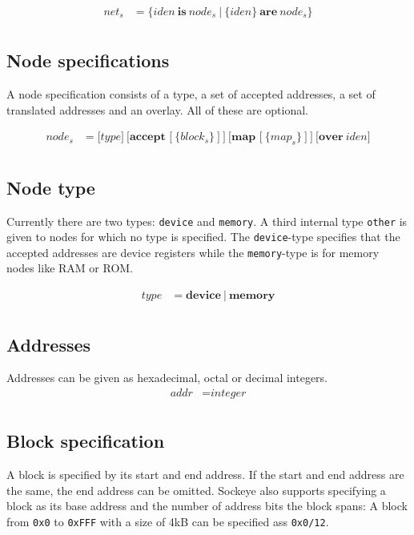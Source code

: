 \documentclass[a4paper,11pt,twoside]{report}
\begin{document}
{{\begin{align*}
\textit{net}_s & \mathop{=}
	\Big\{
		\textit{iden}\ \textbf{is}\ \textit{node}_s\
	\Big|\
		\bigl\{ \textit{iden}\bigr\}\ \textbf{are}\ \textit{node}_s
	\Big\} \\
\end{align*}

\subsection{Node specifications}
A node specification consists of a type, a set of accepted addresses, a set of translated addresses and an overlay.
All of these are optional.

\begin{align*}
\textit{node}_s & \mathop{=}
	\Big[
		\textit{type}
	\Big]\ 	
	\Big[
		\textbf{accept [}\ \big\{\textit{block}_s\big\}\ \textbf{]}\ 
	\Big]\ 
	\Big[
		\textbf{map [}\ \big\{\textit{map}_s\big\}\ \textbf{]}\ 
	\Big]\ 
	\Big[
		\textbf{over}\ \textit{iden}
	\Big] \\
\end{align*}

\subsection{Node type}
Currently there are two types: \verb|device| and \verb|memory|. A third internal type \verb|other| is given to nodes for which no type is specified.
The \verb|device|-type specifies that the accepted addresses are device registers while the \verb|memory|-type is for memory nodes like RAM or ROM.

\begin{align*}
\textit{type} & \mathop{=}
	\textbf{device}\
	|\
	\textbf{memory} \\
\end{align*}

\subsection{Addresses}
Addresses can be given as hexadecimal, octal or decimal integers.
\begin{align*}
\textit{addr} & \mathop{=} \textit{integer} \\
\end{align*}

\subsection{Block specification}
A block is specified by its start and end address.
If the start and end address are the same, the end address can be omitted.
Sockeye also supports specifying a block as its base address and the number of address bits the block spans:
A block from \texttt{0x0} to \texttt{0xFFF} with a size of 4kB can be specified ass \verb|0x0/12|.

}}
\end{document}
